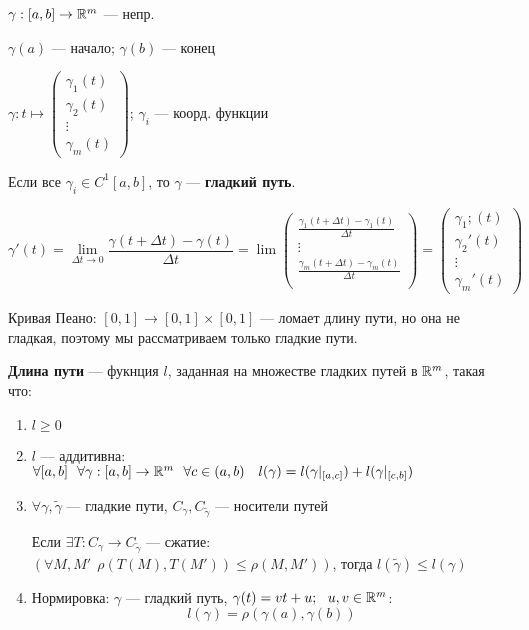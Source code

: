 $\gamma:[a,b]\to\mathbb{R}^m$ --- непр.

$\gamma(a)$ --- начало; $\gamma(b)$ --- конец

$\gamma:t\mapsto \begin{pmatrix}
    \gamma_1(t) \\
    \gamma_2(t) \\
    \vdots \\
    \gamma_m(t)
\end{pmatrix}$; $\gamma_i$ --- коорд. функции

Если все $\gamma_i\in C^1 [a,b]$, то $\gamma$ --- \textbf{гладкий путь}.

$$\gamma'(t)=\lim\limits_{\Delta t\to0}\frac{\gamma(t+\Delta t)-\gamma(t)}{\Delta t}=\lim \begin{pmatrix}
    \frac{\gamma_1(t+\Delta t)-\gamma_1(t)}{\Delta t} \\
    \vdots \\
    \frac{\gamma_m(t+\Delta t)-\gamma_m(t)}{\Delta t} \\
\end{pmatrix}=\begin{pmatrix}
    \gamma_1;(t) \\
    \gamma_2'(t) \\
    \vdots \\
    \gamma_m'(t)
\end{pmatrix}$$

Кривая Пеано: $[0,1]\to[0,1]\times[0,1]$ --- ломает длину пути, но она не гладкая, поэтому мы рассматриваем только гладкие пути.

\begin{definition}
    \textbf{Длина пути} --- фукнция $l$, заданная на множестве гладких путей в $\mathbb{R}^m$, такая что:
    \begin{enumerate}
        \item $l\geq 0$
        \item $l$ --- аддитивна: $\forall [a,b] \ \ \forall \gamma:[a,b]\to\mathbb{R}^m \ \ \forall c\in(a,b) \quad l(\gamma)=l(\gamma|_{[a,c]})+l(\gamma|_{[c,b]})$
        \item $\forall \gamma, \tilde \gamma$ --- гладкие пути, $C_\gamma, C_{\tilde \gamma}$ --- носители путей
        
        Если $\exists T : C_\gamma\to C_{\tilde\gamma}$ --- сжатие: $(\forall M, M' \ \ \rho(T(M), T(M'))\leq \rho(M, M'))$, тогда $l(\tilde\gamma)\leq l(\gamma)$

        \item Нормировка: $\gamma$ --- гладкий путь, $\gamma(t)=vt+u; \ \ u,v\in\R^m$:
        $$l(\gamma)=\rho(\gamma(a), \gamma(b))$$
    \end{enumerate}
\end{definition}

